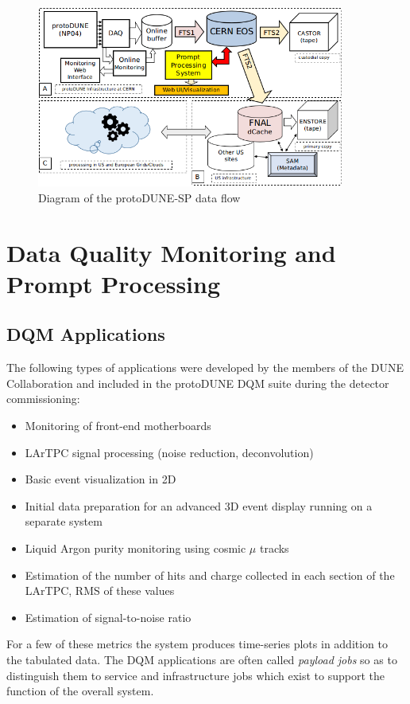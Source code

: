 \documentclass{webofc}
\newcommand{\pd}{protoDUNE\xspace}
\begin{document}
\begin{figure}[tb]
\centering\includegraphics[width=0.9\textwidth]{figures/protoDUNE_data_flow_2018_v1.png}
\caption{\label{fig:dataflow}Diagram of the protoDUNE-SP data flow}
\end{figure}


\section{Data Quality Monitoring and Prompt Processing}
\subsection{DQM Applications}
The following types of applications were developed by the members of the DUNE Collaboration and
included in the \pd DQM suite during the detector
commissioning:
\begin{itemize}
\item Monitoring of front-end motherboards
\item LArTPC signal processing (noise reduction, deconvolution)
\item Basic event visualization in 2D
\item Initial data preparation for an advanced 3D event display running on a separate system
\item Liquid Argon purity monitoring using cosmic $\mu$ tracks
\item Estimation of the number of hits and charge collected in each section of the LArTPC, RMS of these values
\item Estimation of signal-to-noise ratio
\end{itemize}

\noindent For a few of these metrics the system produces time-series plots in addition to the tabulated data.
The DQM applications are often called \textit{payload jobs} so as to distinguish
them to service and infrastructure jobs which exist to support the function of the overall system.
\end{document}

